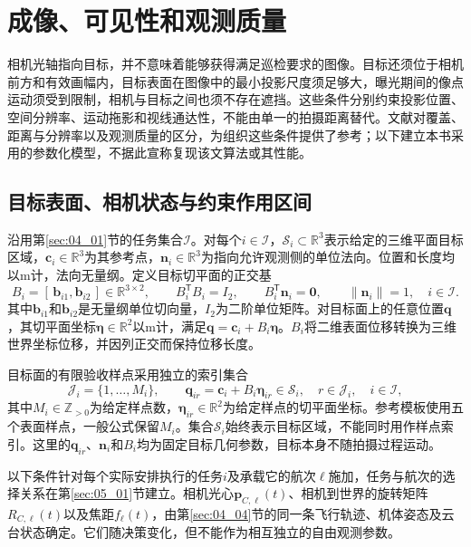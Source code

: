 \section{成像、可见性和观测质量}
\label{sec:04_05}

相机光轴指向目标，并不意味着能够获得满足巡检要求的图像。目标还须位于相机前方和有效画幅内，目标表面在图像中的最小投影尺度须足够大，曝光期间的像点运动须受到限制，相机与目标之间也须不存在遮挡。这些条件分别约束投影位置、空间分辨率、运动拖影和视线通达性，不能由单一的拍摄距离替代。文献\cite{Debus2023}对覆盖、距离与分辨率以及观测质量的区分，为组织这些条件提供了参考；以下建立本书采用的参数化模型，不据此宣称复现该文算法或其性能。

\subsection{目标表面、相机状态与约束作用区间}

沿用第\ref{sec:04_01}节的任务集合$\mathcal I$。对每个$i\in\mathcal I$，$\mathcal S_i\subset\mathbb R^3$表示给定的三维平面目标区域，$\mathbf c_i\in\mathbb R^3$为其参考点，$\mathbf n_i\in\mathbb R^3$为指向允许观测侧的单位法向。位置和长度均以$\mathrm m$计，法向无量纲。定义目标切平面的正交基
\begin{equation}
 B_i=[\,\mathbf b_{i1},\mathbf b_{i2}\,]\in\mathbb R^{3\times2},
 \qquad B_i^{\mathsf T}B_i=I_2,
 \qquad B_i^{\mathsf T}\mathbf n_i=\mathbf0,
 \qquad \|\mathbf n_i\|=1,
 \quad i\in\mathcal I.
 \label{s0405:tangent_basis}
\end{equation}
其中$\mathbf b_{i1}$和$\mathbf b_{i2}$是无量纲单位切向量，$I_2$为二阶单位矩阵。对目标面上的任意位置$\mathbf q$，其切平面坐标$\boldsymbol\eta\in\mathbb R^2$以$\mathrm m$计，满足$\mathbf q=\mathbf c_i+B_i\boldsymbol\eta$。$B_i$将二维表面位移转换为三维世界坐标位移，并因列正交而保持位移长度。

目标面的有限验收样点采用独立的索引集合
\begin{equation}
 \mathcal J_i=\{1,\ldots,M_i\},\qquad
 \mathbf q_{ir}=\mathbf c_i+B_i\boldsymbol\eta_{ir}\in\mathcal S_i,
 \quad r\in\mathcal J_i,\quad i\in\mathcal I,
 \label{s0405:surface_samples}
\end{equation}
其中$M_i\in\mathbb Z_{>0}$为给定样点数，$\boldsymbol\eta_{ir}\in\mathbb R^2$为给定样点的切平面坐标。参考模板使用五个表面样点，一般公式保留$M_i$。集合$\mathcal S_i$始终表示目标区域，不能同时用作样点索引。这里的$\mathbf q_{ir}$、$\mathbf n_i$和$B_i$均为固定目标几何参数，目标本身不随拍摄过程运动。

以下条件针对每个实际安排执行的任务$i$及承载它的航次$\ell$施加，任务与航次的选择关系在第\ref{sec:05_01}节建立。相机光心$\mathbf p_{C,\ell}(t)$、相机到世界的旋转矩阵$R_{C,\ell}(t)$以及焦距$f_\ell(t)$，由第\ref{sec:04_04}节的同一条飞行轨迹、机体姿态及云台状态确定。它们随决策变化，但不能作为相互独立的自由观测参数。

